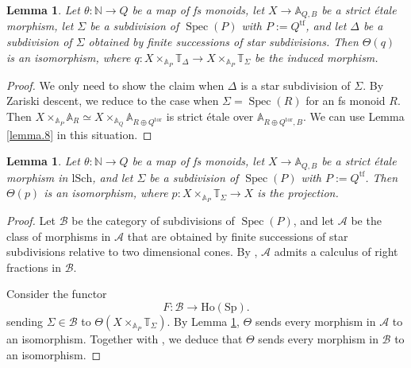 \documentclass[10pt]{amsart}
\newtheorem{lem}[thm]{Lemma}
\theoremstyle{definition}
\theoremstyle{remark}
\numberwithin{equation}{subsection}
\newcommand{\A}{\mathbb{A}}
\newcommand{\N}{\mathbb{N}}
\newcommand{\T}{\mathbb{T}}
\newcommand{\cA}{\mathcal{A}}
\newcommand{\cB}{\mathcal{B}}
\DeclareMathOperator{\Spec}{Spec}
\newcommand{\Spt}{\mathrm{Sp}}
\newcommand{\Ho}{\mathrm{Ho}}
\newcommand{\tor}{\mathrm{tor}}
\newcommand{\tf}{\mathrm{tf}}
\newcommand{\lSch}{\mathrm{lSch}}
\begin{document}
\begin{lem}
\label{lemma.14}
Let $\theta\colon \N\to Q$ be a map of fs monoids, let $X\to \A_{Q,B}$ be a strict \'etale morphism, let $\Sigma$ be a subdivision of $\Spec(P)$ with $P:=Q^\tf$, and let $\Delta$ be a subdivision of $\Sigma$ obtained by finite successions of star subdivisions.
Then $\Theta(q)$ is an isomorphism, where $q\colon X\times_{\A_{P}}\T_{\Delta}\to X\times_{\A_{P}}\T_{\Sigma}$ be the induced morphism.
\end{lem}
\begin{proof}
We only need to show the claim when $\Delta$ is a star subdivision of $\Sigma$.
By Zariski descent, we reduce to the case when $\Sigma= \Spec(R)$ for an fs monoid $R$.
Then $X\times_{\A_P}\A_R\simeq X\times_{\A_Q}\A_{R\oplus Q^\tor}$ is strict \'etale over $\A_{R\oplus Q^\tor,B}$.
We can use Lemma \ref{lemma.8} in this situation.
\end{proof}

\begin{lem}
\label{lemma.13}
Let $\theta\colon \N\to Q$ be a map of fs monoids, let $X\to \A_{Q,B}$ be a strict \'etale morphism in $\lSch$, and let $\Sigma$ be a subdivision of $\Spec(P)$ with $P:=Q^\tf$.
Then $\Theta(p)$ is an isomorphism, where $p\colon X\times_{\A_{P}}\T_{\Sigma}\to X$ is the projection.
\end{lem}
\begin{proof}
Let $\cB$ be the category of subdivisions of $\Spec(P)$, and let $\cA$ be the class of morphisms in $\cA$ that are obtained by finite successions of star subdivisions relative to two dimensional cones.
By \cite[Lemma A.3.15]{logDM}, $\cA$ admits a calculus of right fractions in $\cB$.

Consider the functor
\[
F\colon \cB\to \Ho(\Spt).
\]
sending $\Sigma\in \cB$ to $\Theta(X\times_{\A_{P}}\T_{\Sigma})$.
By Lemma \ref{lemma.14}, $\Theta$ sends every morphism in $\cA$ to an isomorphism.
Together with \cite[Lemmas A.3.15, C.2.1]{logDM}, we deduce that $\Theta$ sends every morphism in $\cB$ to an isomorphism.
\end{proof}
\end{document}
